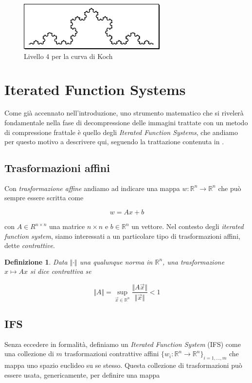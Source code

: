 \documentclass[11pt,a4paper,appendixprefix=true,numbers=noenddot]{scrreprt}
\newtheorem{definizione}{Definizione}
\begin{document}
\begin{figure}[!ht]
\centering
\includegraphics[scale=0.55]{images/koch4.png}
\caption{Livello 4 per la curva di Koch}
\label{fig:k4}
\end{figure}

\section{Iterated Function Systems}

Come già accennato nell'introduzione, uno strumento matematico che si rivelerà fondamentale nella fase di decompressione delle immagini trattate con un metodo di compressione frattale è quello degli \emph{Iterated Function Systems}, che andiamo per questo motivo a descrivere qui, seguendo la trattazione contenuta in \cite{fisher}.

\subsection*{Trasformazioni affini}

Con \emph{trasformazione affine} andiamo ad indicare una mappa $w: \mathbb{R}^n \rightarrow \mathbb{R}^n$ che può sempre essere scritta come

\[
w = Ax + b
\]

con $A \in R^{n \times n}$ una matrice $n \times n$ e $b \in \mathbb{R}^n$ un vettore. Nel contesto degli \emph{iterated function system}, siamo interessati a un particolare tipo di trasformazioni affini, dette \emph{contrattive}.

\begin{definizione}
Data $\Vert \cdot \Vert$  una qualunque norma in $\mathbb{R}^n$, una trasformazione $x \mapsto Ax$ si dice \emph{contrattiva} se 

\[
\Vert A \Vert = \sup_{\vec{x} \in \mathbb{R}^n} \frac{\Vert A\vec{x} \Vert}{\Vert \vec{x} \Vert } < 1
\]
\end{definizione}

\subsection*{IFS}

Senza eccedere in formalità, definiamo un \emph{Iterated Function System} (IFS) come una collezione di $m$ trasformazioni contrattive affini $\{w_i : \mathbb{R}^n \rightarrow \mathbb{R}^n \}_{i=1,\ldots, m}$ che mappa uno spazio euclideo su se stesso. Questa collezione di trasformazioni può essere usata, genericamente, per definire una mappa 
\end{document}
